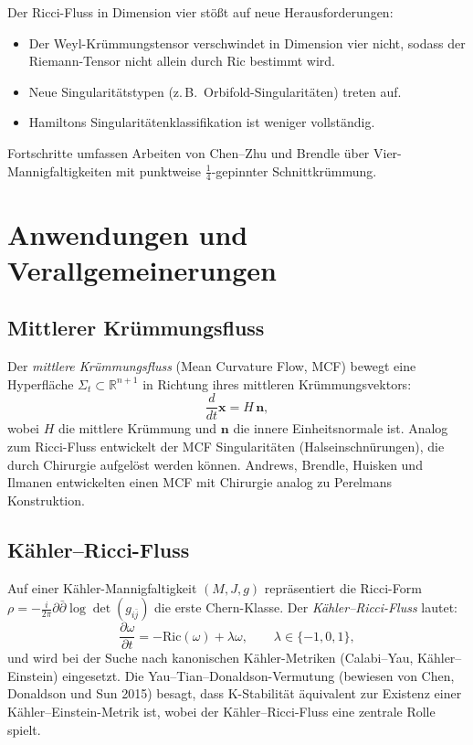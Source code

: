 \documentclass[12pt,a4paper]{amsart}
\theoremstyle{definition}
\theoremstyle{remark}
\newcommand{\R}{\mathbb{R}}
\newcommand{\Ric}{\mathrm{Ric}}
\begin{document}
Der Ricci-Fluss in Dimension vier stößt auf neue Herausforderungen:
\begin{itemize}
  \item Der Weyl-Krümmungstensor verschwindet in Dimension vier nicht, sodass
    der Riemann-Tensor nicht allein durch $\Ric$ bestimmt wird.
  \item Neue Singularitätstypen (z.\,B.\ Orbifold-Singularitäten) treten auf.
  \item Hamiltons Singularitätenklassifikation ist weniger vollständig.
\end{itemize}
Fortschritte umfassen Arbeiten von Chen--Zhu und Brendle über
Vier-Mannigfaltigkeiten mit punktweise $\frac{1}{4}$-gepinnter
Schnittkrümmung.


\section{Anwendungen und Verallgemeinerungen}
\label{sec:anwendungen}

\subsection{Mittlerer Krümmungsfluss}

Der \emph{mittlere Krümmungsfluss} (Mean Curvature Flow, MCF) bewegt eine
Hyperfläche $\Sigma_t \subset \R^{n+1}$ in Richtung ihres mittleren
Krümmungsvektors:
\[
  \frac{d}{dt}\mathbf{x} = H\,\mathbf{n},
\]
wobei $H$ die mittlere Krümmung und $\mathbf{n}$ die innere Einheitsnormale ist.
Analog zum Ricci-Fluss entwickelt der MCF Singularitäten
(Halseinschnürungen), die durch Chirurgie aufgelöst werden können.
Andrews, Brendle, Huisken und Ilmanen entwickelten einen MCF mit Chirurgie
analog zu Perelmans Konstruktion.

\subsection{Kähler--Ricci-Fluss}

Auf einer Kähler-Mannigfaltigkeit $(M, J, g)$ repräsentiert die
Ricci-Form $\rho = -\frac{i}{2\pi}\partial\bar\partial\log\det(g_{i\bar j})$
die erste Chern-Klasse.  Der \emph{Kähler--Ricci-Fluss} lautet:
\[
  \frac{\partial \omega}{\partial t} = -\Ric(\omega) + \lambda\omega, \qquad \lambda \in \{-1, 0, 1\},
\]
und wird bei der Suche nach kanonischen Kähler-Metriken (Calabi--Yau,
Kähler--Einstein) eingesetzt.  Die Yau--Tian--Donaldson-Vermutung (bewiesen
von Chen, Donaldson und Sun 2015) besagt, dass K-Stabilität äquivalent zur
Existenz einer Kähler--Einstein-Metrik ist, wobei der Kähler--Ricci-Fluss
eine zentrale Rolle spielt.
\end{document}
